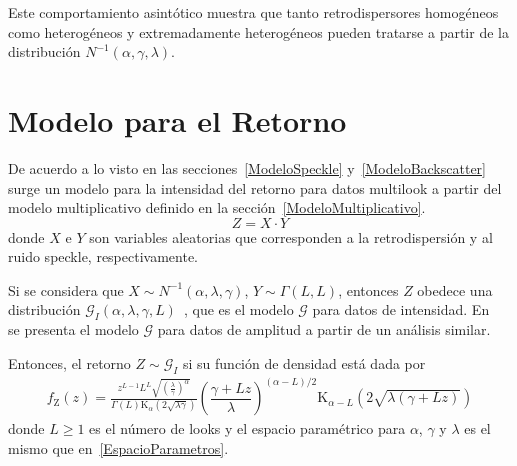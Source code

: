 Este comportamiento asintótico muestra que tanto retrodispersores homogéneos como heterogéneos y extremadamente heterogéneos pueden tratarse a partir de la distribución $N^{-1}(\alpha,\gamma,\lambda)$.


\section{Modelo para el Retorno}
\label{Retorno}

De acuerdo a lo visto en las secciones~\ref{ModeloSpeckle} y~\ref{ModeloBackscatter} surge un modelo para la intensidad del retorno para datos multilook a partir del modelo multiplicativo definido en la sección~\ref{ModeloMultiplicativo}.
\begin{equation*}
Z=X \cdot Y  
\end{equation*}
donde $X$ e $Y$ son variables aleatorias que corresponden a la retrodispersión y al ruido speckle, respectivamente. 

Si se considera que $X \sim N^{-1}(\alpha,\lambda,\gamma )$, $Y \sim \Gamma(L,L)$, entonces $Z$ obedece una distribución $\mathcal G_I(\alpha,\lambda,\gamma,L )$~\cite{Frery99}, que es el modelo $\mathcal{G}$ para datos de intensidad. En~\cite{Frery97} se presenta el modelo $\mathcal{G}$ para datos de amplitud a partir de un análisis similar.

Entonces, el retorno $Z \sim \mathcal{G}_I$ si su función de densidad está dada por
\begin{align}
\label{ModeloGI}
f_{\text{Z}}( z) =\frac{z^{L-1} L^L \sqrt{(\frac{\lambda}{\gamma})^{\alpha}}}{\Gamma(L)\text{K}_{\alpha}(2 \sqrt{\lambda \gamma})} \left(\dfrac{\gamma + Lz}{\lambda}\right)^{(\alpha-L)/2} \text{K}_{\alpha-L}(2\sqrt{\lambda(\gamma+Lz) })
\end{align}
donde $L\geq 1$ es el número de looks y el espacio paramétrico para $\alpha$, $\gamma$ y $\lambda$ es el mismo que en~\eqref{EspacioParametros}.

